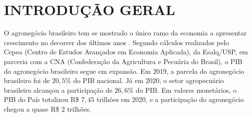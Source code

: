 \documentclass[12pt,a4paper]{article}
\begin{document}
\pagestyle{empty}





\newpage
\thispagestyle{empty}




\newpage


\begin{center}
\renewcommand{\listfigurename}{LISTA DE FIGURAS}
\begin{spacing}{1.4}
\listoffigures
\thispagestyle{empty}
\end{spacing}
\end{center}

\newpage

\begin{center}
\renewcommand{\listtablename}{LISTA DE TABELAS}
\begin{spacing}{1.4}
{
\let\oldnumberline\numberline%
\renewcommand{\numberline}{\tablename~\oldnumberline}
\listoftables 
}
\thispagestyle{empty}
\end{spacing}
\end{center}

\newpage

\begin{center}
\renewcommand{\contentsname}{\normalsize{SUMÁRIO}}
\begin{spacing}{1.4}
\tableofcontents
\thispagestyle{empty}
\end{spacing}
\end{center}


\newpage
\pagestyle{fancy}

\section{INTRODUÇÃO GERAL}

O agronegócio brasileiro tem se mostrado o único ramo da economia a apresentar crescimento no decorrer dos últimos anos \cite{guia_20}. Segundo cálculos realizados pelo Cepea (Centro de Estudos Avançados em Economia Aplicada), da Esalq/USP, em parceria com a CNA (Confederação da Agricultura e Pecuária do Brasil), o PIB do agronegócio brasileiro segue em expansão. Em 2019, a parcela do agronegócio brasileiro foi de  $20,5\%$  do PIB nacional. Já em 2020, o setor agropecuário brasileiro alcançou a participação de $26,6\%$ do PIB. Em valores monetários, o PIB do País totalizou R\$ $7,45$ trilhões em 2020, e a participação do agronegócio chegou a quase R\$ $2$ trilhões. 
\end{document}
